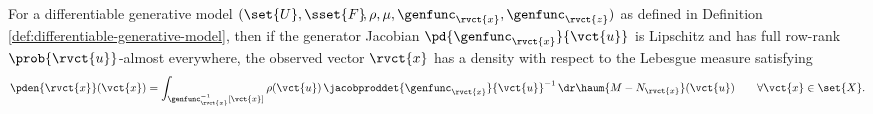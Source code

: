 \begin{proposition}
For a differentiable generative model $(\set{U},\sset{F}\kern-2pt,\rho,\mu,\genfunc_{\rvct{x}},\genfunc_{\rvct{z}})$ as defined in Definition \ref{def:differentiable-generative-model}, then if the generator Jacobian $\pd{\genfunc_{\rvct{x}}}{\vct{u}}$ is Lipschitz and has full row-rank $\prob{\rvct{u}}$-almost everywhere, the observed vector $\rvct{x}$ has a density with respect to the Lebesgue measure satisfying
\begin{equation}\label{eq:dgm-marginal-density-x}
  \pden{\rvct{x}}({\vct{x}})  =
  \int_{\genfunc_{\rvct{x}}^{-1}[\vct{x}]}
    \rho(\vct{u})\,
    \jacobproddet{\genfunc_{\rvct{x}}}{\vct{u}}^{-1}
  \,\dr\haum{M-N_{\rvct{x}}}(\vct{u})
  \qquad \forall \vct{x} \in\set{X}.
\end{equation}
\end{proposition}
